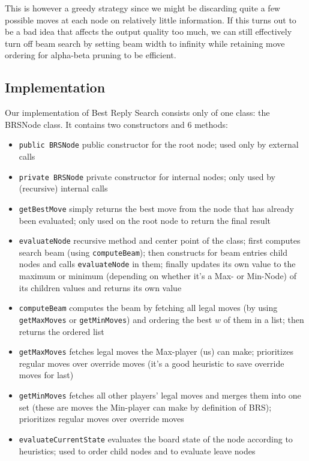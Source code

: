 \documentclass[a4paper,12pt]{article}
\begin{document}
    This is however a greedy strategy since we might be discarding quite a few possible moves at each node on relatively little information. If this turns out to be a bad idea that affects the output quality too much, we can still effectively turn off beam search by setting beam width to infinity while retaining move ordering for alpha-beta pruning to be efficient.
    
    \subsection{Implementation}
    Our implementation of Best Reply Search consists only of one class: the BRSNode class. It contains two constructors and 6 methods:
    \begin{itemize}
        \item \texttt{public BRSNode} \quad public constructor for the root node; used only by external calls
        \item \texttt{private BRSNode} \quad private constructor for internal nodes; only used by (recursive) internal calls
        \item \texttt{getBestMove} \quad simply returns the best move from the node that has already been evaluated; only used on the root node to return the final result
        \item \texttt{evaluateNode} \quad recursive method and center point of the class; first computes search beam (using \texttt{computeBeam}); then constructs for beam entries child nodes and calls \texttt{evaluateNode} in them; finally updates its own value to the maximum or minimum (depending on whether it's a Max- or Min-Node) of its children values and returns its own value
        \item \texttt{computeBeam} \quad computes the beam by fetching all legal moves (by using \texttt{getMaxMoves} or \texttt{getMinMoves}) and ordering the best $w$ of them in a list; then returns the ordered list
        \item \texttt{getMaxMoves} \quad fetches legal moves the Max-player (us) can make; prioritizes regular moves over override moves (it's a good heuristic to save override moves for last)
        \item \texttt{getMinMoves} \quad fetches all other players' legal moves and merges them into one set (these are moves the Min-player can make by definition of BRS); prioritizes regular moves over override moves
        \item \texttt{evaluateCurrentState} \quad evaluates the board state of the node according to heuristics; used to order child nodes and to evaluate leave nodes
    \end{itemize}
    
\end{document}
